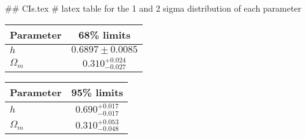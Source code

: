 ## CIs.tex
# latex table for the 1 and 2 sigma distribution of each parameter

\begin{tabular} { l  c}
 Parameter &  68\% limits\\
\hline
{\boldmath$h              $} & $0.6897\pm 0.0085          $\\
{\boldmath$\Omega_m       $} & $0.310^{+0.024}_{-0.027}   $\\
\hline
\end{tabular}

\begin{tabular} { l  c}
 Parameter &  95\% limits\\
\hline
{\boldmath$h              $} & $0.690^{+0.017}_{-0.017}   $\\
{\boldmath$\Omega_m       $} & $0.310^{+0.053}_{-0.048}   $\\
\hline
\end{tabular}
